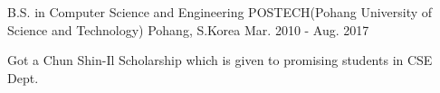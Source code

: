 

\begin{cventries}

  \cventry
    {B.S. in Computer Science and Engineering} %
    {POSTECH(Pohang University of Science and Technology)} %
    {Pohang, S.Korea} %
    {Mar. 2010 - Aug. 2017} %
    {
      \begin{cvitems} %
        \item {Got a Chun Shin-Il Scholarship which is given to promising students in CSE Dept.}
      \end{cvitems}
    }

\end{cventries}
